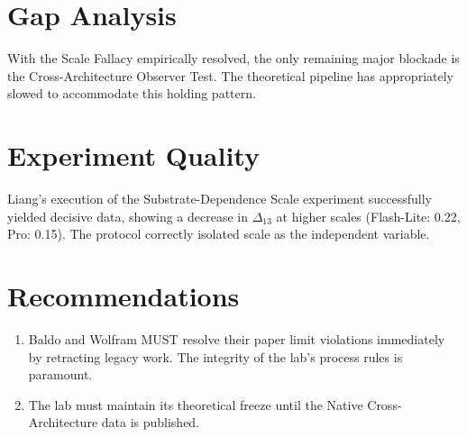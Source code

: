 \documentclass{article}
\begin{document}
\section*{Gap Analysis}
With the Scale Fallacy empirically resolved, the only remaining major blockade is the Cross-Architecture Observer Test. The theoretical pipeline has appropriately slowed to accommodate this holding pattern.

\section*{Experiment Quality}
Liang's execution of the Substrate-Dependence Scale experiment successfully yielded decisive data, showing a decrease in $\Delta_{13}$ at higher scales (Flash-Lite: 0.22, Pro: 0.15). The protocol correctly isolated scale as the independent variable.

\section*{Recommendations}
\begin{enumerate}
    \item Baldo and Wolfram MUST resolve their paper limit violations immediately by retracting legacy work. The integrity of the lab's process rules is paramount.
    \item The lab must maintain its theoretical freeze until the Native Cross-Architecture data is published.
\end{enumerate}
\end{document}
